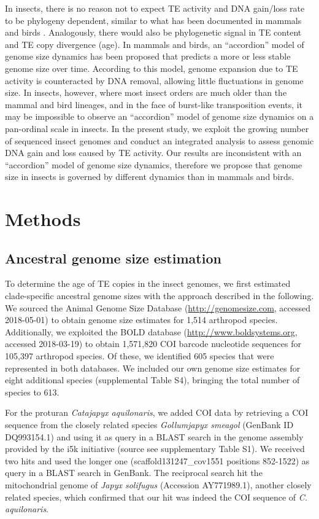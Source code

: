 In insects, there is no reason not to expect TE activity and DNA
gain/loss rate to be phylogeny dependent, similar to what has been
documented in mammals and birds \citep{Kapusta2017a}. Analogously, there
would also be phylogenetic signal in TE content and TE copy divergence
(age). In mammals and birds, an ``accordion'' model of genome size
dynamics has been proposed \citep{Kapusta2017a} that predicts a more or
less stable genome size over time. According to this model, genome
expansion due to TE activity is counteracted by DNA removal, allowing
little fluctuations in genome size. In insects, however, where most
insect orders are much older than the mammal and bird lineages, and in
the face of burst-like transposition events, it may be impossible to
observe an ``accordion'' model of genome size dynamics on a pan-ordinal
scale in insects. In the present study, we exploit the growing number of
sequenced insect genomes and conduct an integrated analysis to assess
genomic DNA gain and loss caused by TE activity. Our results are
inconsistent with an ``accordion'' model of genome size dynamics,
therefore we propose that genome size in insects is governed by
different dynamics than in mammals and birds.

\section{Methods}

\subsection{Ancestral genome size
estimation}

To determine the age of TE copies in the insect genomes, we first
estimated clade-specific ancestral genome sizes with the approach
described in the following. We sourced the Animal Genome Size Database
\citep{Gregory2018} (\url{http://genomesize.com}, accessed 2018-05-01) to
obtain genome size estimates for 1,514 arthropod species. Additionally,
we exploited the BOLD database \citep{Ratnasingham2007}
(\url{http://www.boldsystems.org}, accessed 2018-03-19) to obtain
1,571,820 COI barcode nucleotide sequences for 105,397 arthropod
species. Of these, we identified 605 species that were represented in
both databases. We included our own genome size estimates for eight
additional species (supplemental Table S4), bringing the total number of
species to 613.

For the proturan \emph{Catajapyx aquilonaris}, we added COI data by
retrieving a COI sequence from the closely related species
\emph{Gollumjapyx smeagol} (GenBank ID DQ993154.1) and using it as query
in a BLAST search in the genome assembly provided by the i5k initiative
(source see supplementary Table S1). We received two hits and used the
longer one (scaffold131247\_cov1551 positions 852-1522) as query in a
BLAST search in GenBank. The reciprocal search hit the mitochondrial
genome of \emph{Japyx solifugus} (Accession AY771989.1), another closely
related species, which confirmed that our hit was indeed the COI
sequence of \emph{C. aquilonaris}.

